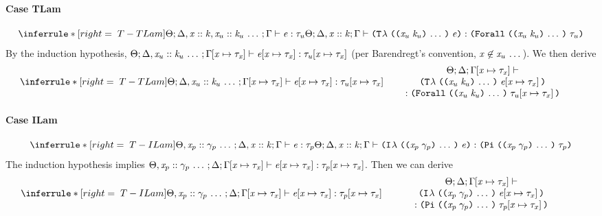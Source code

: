 \begin{sproof}
  \paragraph{Case {\sc TLam}}
  \[{\infr[T-TLam]
    {\typeof{\sEnv}{\kEnv, \haskind{\var}{\kind}, \sequence{\haskind{\var_u}{\kind_u}}}{\tEnv}
      {\expr}
      {\type_u}}
    {\typeof{\sEnv}{\kEnv, \haskind{\var}{\kind}}{\tEnv}
      {\tlam{\sequence{\notevar{\var_u}{\kind_u}}}{\expr}}
      {\typeuniv{\sequence{\notevar{\var_u}{\kind_u}}}{\type_u}}}}\]
  By the induction hypothesis,
  $\Theta;\Delta, \mathit{x}_u :: \mathit{k}_u \, \ldots \,;\Gamma\hspace{-2pt}\left[ \mathit{x} \mapsto \mathit{\tau}_{\mathit{x}} \right] \vdash \mathit{e}\hspace{-2pt}\left[ \mathit{x} \mapsto \mathit{\tau}_{\mathit{x}} \right] : \mathit{\tau}_u\hspace{-2pt}\left[ \mathit{x} \mapsto \mathit{\tau}_{\mathit{x}} \right]$
  (per Barendregt's convention, $\mathit{x} \not\in \mathit{x}_u \, \ldots \,$).
  We then derive
  \[{\infr[T-TLam]
    {\typeof{\sEnv}{\kEnv, \sequence{\haskind{\var_u}{\kind_u}}}{\typesubst{\tEnv}}
      {\typesubst{\expr}}{\typesubst{\type_u}}}
    {\parbox{0.6\textwidth}
      {\centering
        \({\sEnv};{\kEnv};{\typesubst{\tEnv}}\vdash\)
        \({\tlam{\sequence{\notevar{\var_u}{\kind_u}}}{\typesubst{\expr}}}\)
        \(:{\typeuniv{\sequence{\notevar{\var_u}{\kind_u}}}{\typesubst{\type_u}}}\)}}}\]
  \paragraph{Case {\sc ILam}}
  \[{\infr[T-ILam]
    {\typeof{\sEnv, \sequence{\hassort{\var_p}{\sort_p}}}{\kEnv, \haskind{\var}{\kind}}{\tEnv}
      {\expr}
      {\type_p}}
    {\typeof{\sEnv}{\kEnv, \haskind{\var}{\kind}}{\tEnv}
      {\ilam{\sequence{\notevar{\var_p}{\sort_p}}}{\expr}}
      {\typedprod{\sequence{\notevar{\var_p}{\sort_p}}}{\type_p}}}}\]
  The induction hypothesis implies
  $\Theta, \mathit{x}_p :: \mathit{\gamma}_p \, \ldots \,;\Delta;\Gamma\hspace{-2pt}\left[ \mathit{x} \mapsto \mathit{\tau}_{\mathit{x}} \right] \vdash \mathit{e}\hspace{-2pt}\left[ \mathit{x} \mapsto \mathit{\tau}_{\mathit{x}} \right] : \mathit{\tau}_p\hspace{-2pt}\left[ \mathit{x} \mapsto \mathit{\tau}_{\mathit{x}} \right]$.
  Then we can derive
  \[{\infr[T-ILam]
    {\typeof{\sEnv, \sequence{\hassort{\var_p}{\sort_p}}}{\kEnv}{\typesubst{\tEnv}}
      {\typesubst{\expr}}
      {\typesubst{\type_p}}}
    {\parbox{0.6\textwidth}
      {\centering
        \({\sEnv};{\kEnv};{\typesubst{\tEnv}}\vdash\)
        \({\ilam{\sequence{\notevar{\var_p}{\sort_p}}}{\typesubst{\expr}}}\)
        \(:{\typedprod{\sequence{\notevar{\var_p}{\sort_p}}}{\typesubst{\type_p}}}\)}}}\]

\end{sproof}
